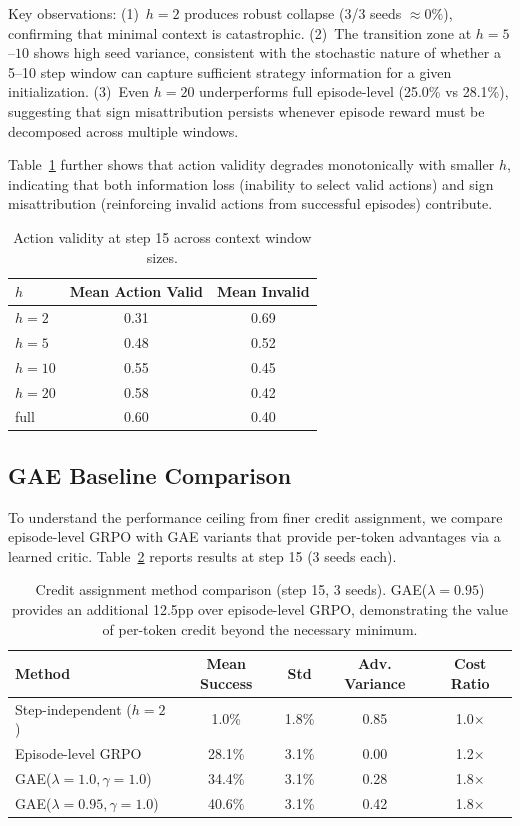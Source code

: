 \documentclass[11pt]{article}
\begin{document}
Key observations: (1)~$h=2$ produces robust collapse (3/3 seeds $\approx 0\%$), confirming that minimal context is catastrophic. (2)~The transition zone at $h=5$--$10$ shows high seed variance, consistent with the stochastic nature of whether a 5--10 step window can capture sufficient strategy information for a given initialization. (3)~Even $h=20$ underperforms full episode-level (25.0\% vs 28.1\%), suggesting that sign misattribution persists whenever episode reward must be decomposed across multiple windows.

Table~\ref{tab:hsweep_validity} further shows that action validity degrades monotonically with smaller $h$, indicating that both information loss (inability to select valid actions) and sign misattribution (reinforcing invalid actions from successful episodes) contribute.

\begin{table}[h]
\centering
\caption{Action validity at step 15 across context window sizes.}
\label{tab:hsweep_validity}
\begin{tabular}{lcc}
\toprule
$h$ & Mean Action Valid & Mean Invalid \\
\midrule
$h=2$ & 0.31 & 0.69 \\
$h=5$ & 0.48 & 0.52 \\
$h=10$ & 0.55 & 0.45 \\
$h=20$ & 0.58 & 0.42 \\
full & 0.60 & 0.40 \\
\bottomrule
\end{tabular}
\end{table}

\subsection{GAE Baseline Comparison}
\label{sec:gae}

To understand the performance ceiling from finer credit assignment, we compare episode-level GRPO with GAE variants that provide per-token advantages via a learned critic. Table~\ref{tab:gae} reports results at step 15 (3 seeds each).

\begin{table}[h]
\centering
\caption{Credit assignment method comparison (step 15, 3 seeds). GAE($\lambda=0.95$) provides an additional 12.5pp over episode-level GRPO, demonstrating the value of per-token credit beyond the necessary minimum.}
\label{tab:gae}
\begin{tabular}{lcccc}
\toprule
Method & Mean Success & Std & Adv. Variance & Cost Ratio \\
\midrule
Step-independent ($h=2$) & 1.0\% & 1.8\% & 0.85 & 1.0$\times$ \\
Episode-level GRPO & 28.1\% & 3.1\% & 0.00 & 1.2$\times$ \\
GAE($\lambda=1.0, \gamma=1.0$) & 34.4\% & 3.1\% & 0.28 & 1.8$\times$ \\
GAE($\lambda=0.95, \gamma=1.0$) & 40.6\% & 3.1\% & 0.42 & 1.8$\times$ \\
\bottomrule
\end{tabular}
\end{table}
\end{document}
